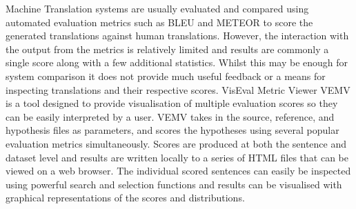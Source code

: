 Machine Translation systems are usually evaluated and compared using automated evaluation metrics such as BLEU and METEOR to score the generated translations against human translations. However, the interaction with the output from the metrics is relatively limited and results are commonly a single score along with a few additional statistics. Whilst this may be enough for system comparison it does not provide much  useful feedback or a means for inspecting translations and their respective scores. VisEval Metric Viewer {VEMV} is a tool designed to provide visualisation of multiple evaluation scores so they can be easily interpreted by a user. VEMV takes in the source, reference, and hypothesis files as parameters, and scores the hypotheses using several popular evaluation metrics simultaneously. Scores are produced at both the sentence and dataset level and results are written locally to a series of HTML files that can be viewed on a web browser. The individual scored sentences can easily be inspected using powerful search and selection functions and results can be visualised with graphical representations of the scores and distributions.
